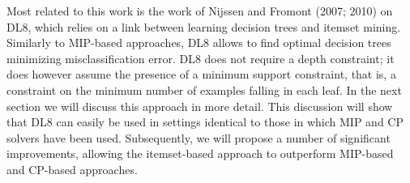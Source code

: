 Most related to this work is the work of Nijssen and Fromont (2007; 2010) on DL8, which relies on a link between learning decision trees and itemset mining. Similarly to MIP-based approaches, DL8 allows to find optimal decision trees minimizing misclassification error. DL8 does not require a depth constraint; it does however assume the presence of a minimum support constraint, that is, a constraint on the minimum number of examples falling in each leaf. In the next section we will discuss this approach in more detail. This discussion will show that DL8 can easily be used in settings identical to those in which MIP and CP solvers have been used. Subsequently, we will propose a number of significant improvements, allowing the itemset-based approach to outperform MIP-based and CP-based approaches.

